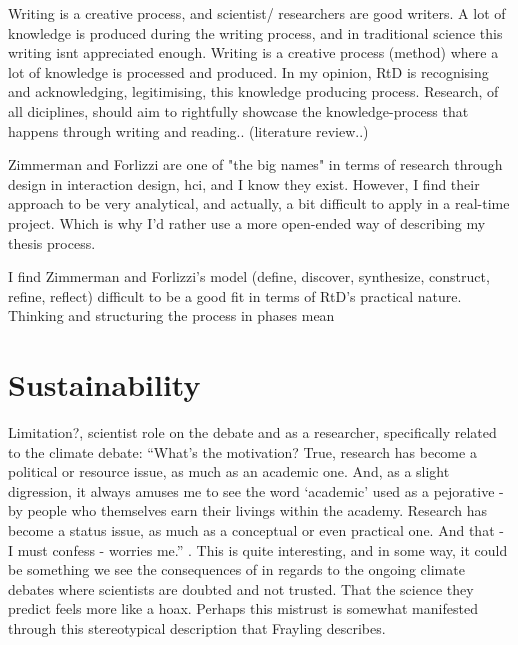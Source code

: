 Writing is a creative process, and scientist/ researchers are good writers. A lot of knowledge is produced during the writing process, and in traditional science this writing isnt appreciated enough. Writing is a creative process (method) where a lot of knowledge is processed and produced. In my opinion, RtD is recognising and acknowledging, legitimising, this knowledge producing process. Research, of all diciplines, should aim to rightfully showcase the knowledge-process that happens through writing and reading..  (literature review..)

Zimmerman and Forlizzi are one of "the big names" in terms of research through design in interaction design, hci, and I know they exist. However, I find their approach to be very analytical, and actually, a bit difficult to apply in a real-time project. Which is why I'd rather use a more open-ended way of describing my thesis process. 

I find Zimmerman and Forlizzi's model (define, discover, synthesize, construct, refine, reflect) difficult to be a good fit in terms of RtD's practical nature. Thinking and structuring the process in phases mean 



\section{Sustainability}

Limitation?, scientist role on the debate and as a researcher, specifically related to the climate debate:
“What’s the motivation? True, research has become a political or resource issue, as much as an academic one. And, as a slight digression, it always amuses me to see the word ‘academic’ used as a pejorative - by people who themselves earn their livings within the academy. Research has become a status issue, as much as a conceptual or even practical one. And that - I must confess - worries me.” \autocite[p. 5]{frayling_1994}. This is quite interesting, and in some way, it could be something we see the consequences of in regards to the ongoing climate debates where scientists are doubted and not trusted. That the science they predict feels more like a hoax. Perhaps this mistrust is somewhat manifested through this stereotypical description that Frayling describes.